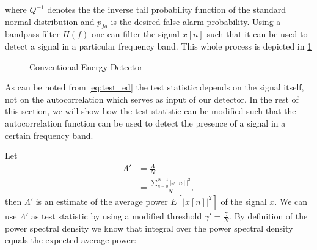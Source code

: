 \documentclass[a4paper, openany, oneside]{memoir}
\begin{document}
where $Q^{-1}$ denotes the the inverse tail probability function of the standard normal distribution and $p_{fa}$ is the desired false alarm probability.
Using a bandpass filter $H(f)$ one can filter the signal $x[n]$ such that it can be used to detect a signal in a particular frequency band. This whole process is depicted
in \cref{tkz:conv_ed}
\begin{figure}[H]
\centering
{}
\caption{Conventional Energy Detector}\label{tkz:conv_ed}
\end{figure}


As can be noted from \cref{eq:test_ed} the test statistic depends on the signal itself, not on the autocorrelation which serves as input of our detector.
In the rest of this section, we will show how the test statistic can be modified
such that the autocorrelation function can be used to detect the presence of  a signal in a certain frequency band.

Let 
\begin{align*}
\Lambda' &= \frac{\Lambda}{N}\\
	&= \frac{\sum_{n=0}^{N-1} |x[n]|^2}{N},
\end{align*}
then $\Lambda'$ is an estimate of the average power $E\left[|x[n]|^2\right]$ of the signal $x$. We can use $\Lambda'$ as test statistic by using a modified threshold $\gamma' = \frac{\gamma}{N}$. By definition of the power spectral density we know that integral over the power spectral density equals the expected average power:
\end{document}
